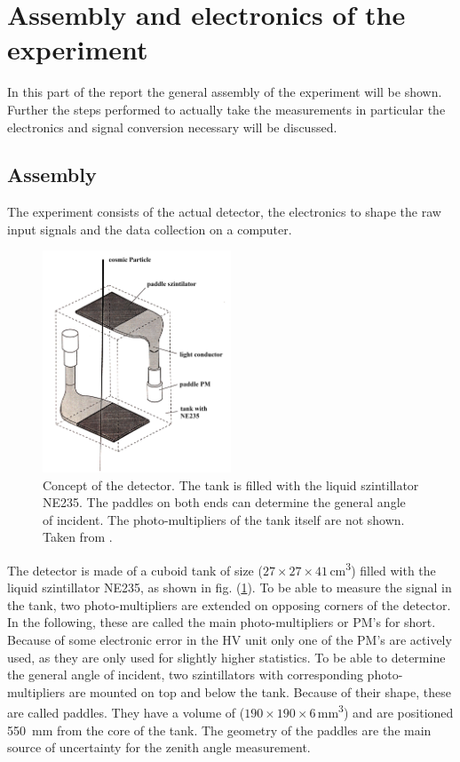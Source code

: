 \section{Assembly and electronics of the experiment} \label{sec:aufbau}

In this part of the report the general assembly of the experiment will be shown.
Further the steps performed to actually take the measurements in particular the electronics and signal conversion necessary will be discussed.

\subsection{Assembly}

	The experiment consists of the actual detector, the electronics to shape the raw input signals and the data collection on a computer.

	\begin{figure}[ht]
		\centering
		\includegraphics[width=0.5\textwidth]{img/aufbau.jpg}
		\caption{Concept of the detector. 
			The tank is filled with the liquid szintillator NE235.
			The paddles on both ends can determine the general angle of incident.
			The photo-multipliers of the tank itself are not shown.
			Taken from \cite{wwu}.}
		\label{fig:detector}
	\end{figure}
	
	The detector is made of a cuboid tank of size ($27 \times 27 \times 41$\,\si{\centi\meter\cubed}) filled with the liquid szintillator NE235, as shown in fig. (\ref{fig:detector}).
	To be able to measure the signal in the tank, two photo-multipliers are extended on opposing corners of the detector.
	In the following, these are called the main photo-multipliers or PM's for short.
	Because of some electronic error in the HV unit only one of the PM's are actively used, as they are only used for slightly higher statistics.
	To be able to determine the general angle of incident, two szintillators with corresponding photo-multipliers are mounted on top and below the tank.
	Because of their shape, these are called paddles.
	They have a volume of ($190 \times 190 \times 6$\,\si{\milli\meter\cubed}) and are positioned \SI{550}{\milli\meter} from the core of the tank.
	The geometry of the paddles are the main source of uncertainty for the zenith angle measurement.
	
